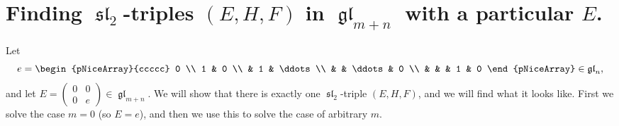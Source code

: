 \documentclass[12pt,psamsfonts]{article}
\DeclareMathOperator{\gl}{\mathfrak{gl}}
\DeclareMathOperator{\spl}{\mathfrak{sl}}
\begin{document}
\section{Finding \(\spl_2\)-triples \((E, H, F)\) in \(\gl_{m + n}\) with a particular \(E\).}
\par Let
\[e = \begin{pNiceArray}{ccccc}
 0 \\
    1 & 0 \\
  & 1 & \ddots \\
   & & \ddots & 0 \\
   &   &  & 1 & 0
   \end{pNiceArray} \in \mathfrak{gl}_{n},\]
and let \(E = \begin{pmatrix}0 & 0 \\ 0 & e\end{pmatrix} \in \gl_{m + n}\).
We will show that there is exactly one \(\spl_2\)-triple \((E, H, F)\), and we will find what it looks like.
First we solve the case \(m = 0\) (so \(E = e\)), and then we use this to solve the case of arbitrary \(m\).
\end{document}
